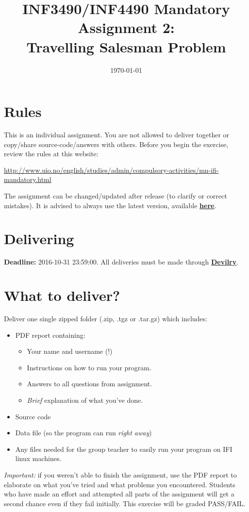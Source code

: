 \documentclass{article}           %
\title{\vspace{-2cm}INF3490/INF4490 Mandatory Assignment 2:\\
Travelling Salesman Problem}
\date{\today}
\newcommand\marginsymbol[1][0pt]{%
\tabto*{0cm}\makebox[\dimexpr-1cm-#1\relax][r]{$\mathbb{P}$}\tabto*{\TabPrevPos}}
\begin{document}
    \renewcommand\marginsymbol[1][0pt]{%
  \tabto*{0cm}\makebox[-1cm][c]{$\mathbb{P}$}\tabto*{\TabPrevPos}}

\maketitle
\section*{Rules}
This is an individual assignment.
You are not allowed to deliver together or copy/share source-code/answers with others.
Before you begin the exercise, review the rules at this website:
\begin{center}
\url{http://www.uio.no/english/studies/admin/compulsory-activities/mn-ifi-mandatory.html}
\end{center}


The assignment can be changed/updated after release (to clarify or correct mistakes).
It is advised to always use the latest version, available
 \href{http://www.uio.no/studier/emner/matnat/ifi/INF3490/h16/assignment-2/inf3490-as2.pdf}{\textbf{here}}.

\section*{Delivering}
\textbf{Deadline:} 2016-10-31 23:59:00. All deliveries must be made through
\href{https://devilry.ifi.uio.no}{\textbf{Devilry}}.
\section*{What to deliver?}
Deliver one single zipped folder (.zip, .tgz or .tar.gz) which includes:
\begin{itemize}
    \item PDF report containing:
    \begin{itemize}
        \item Your name and username (!)
        \item Instructions on how to run your program.
        \item Answers to all questions from assignment.
        \item \emph{Brief} explanation of what you've done.
    \end{itemize}
    \item Source code
    \item Data file (so the program can run \emph{right away})
    \item Any files needed for the group teacher to easily run your program on
          IFI linux machines.
\end{itemize}
\emph{Important: } if you weren't able to finish the assignment, use the PDF
report to elaborate on what you've tried and what problems you encountered.
Students who have made an effort and attempted all parts of the assignment
will get a second chance even if they fail initially. This exercise will be
graded PASS/FAIL.
\end{document}
